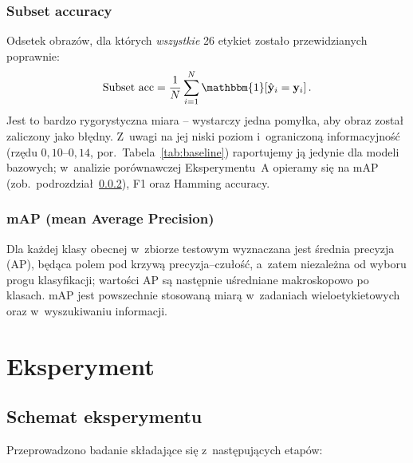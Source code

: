 \documentclass[12pt,a4paper]{article}
\begin{document}
\subsubsection{Subset accuracy}
Odsetek obrazów, dla których \emph{wszystkie} 26 etykiet zostało przewidzianych poprawnie:
\begin{equation}
    \text{Subset acc} = \frac{1}{N} \sum_{i=1}^{N} \mathbbm{1}\!\left[\hat{\mathbf{y}}_i = \mathbf{y}_i\right].
\end{equation}
Jest to bardzo rygorystyczna miara -- wystarczy jedna pomyłka, aby obraz został zaliczony jako błędny. Z~uwagi na jej niski poziom i~ograniczoną informacyjność (rzędu $0{,}10$--$0{,}14$, por.~Tabela~\ref{tab:baseline}) raportujemy ją jedynie dla modeli bazowych; w~analizie porównawczej Eksperymentu~A opieramy się na mAP (zob.~podrozdział~\ref{sec:map}), F1 oraz Hamming accuracy.

\subsubsection{mAP (mean Average Precision)}
\label{sec:map}
Dla każdej klasy obecnej w~zbiorze testowym wyznaczana jest średnia precyzja (AP), będąca polem pod krzywą precyzja--czułość, a~zatem niezależna od wyboru progu klasyfikacji; wartości AP są następnie uśredniane makroskopowo po klasach. mAP jest powszechnie stosowaną miarą w~zadaniach wieloetykietowych oraz w~wyszukiwaniu informacji.

\clearpage
\section{Eksperyment}
\label{sec:eksperyment}

\subsection{Schemat eksperymentu}

Przeprowadzono badanie składające się z~następujących etapów:
\end{document}
